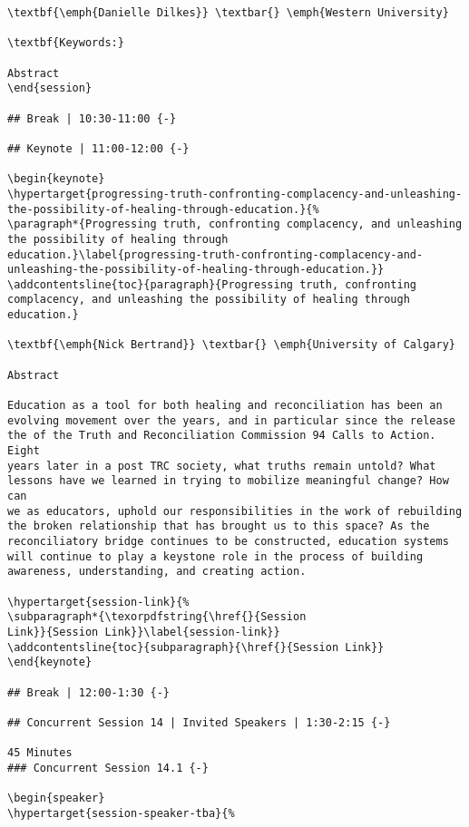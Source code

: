 \documentclass[
]{book}
\begin{document}
\begin{verbatim}
\textbf{\emph{Danielle Dilkes}} \textbar{} \emph{Western University}

\textbf{Keywords:}

Abstract
\end{session}

## Break | 10:30-11:00 {-}

## Keynote | 11:00-12:00 {-}

\begin{keynote}
\hypertarget{progressing-truth-confronting-complacency-and-unleashing-the-possibility-of-healing-through-education.}{%
\paragraph*{Progressing truth, confronting complacency, and unleashing
the possibility of healing through
education.}\label{progressing-truth-confronting-complacency-and-unleashing-the-possibility-of-healing-through-education.}}
\addcontentsline{toc}{paragraph}{Progressing truth, confronting
complacency, and unleashing the possibility of healing through
education.}

\textbf{\emph{Nick Bertrand}} \textbar{} \emph{University of Calgary}

Abstract

Education as a tool for both healing and reconciliation has been an
evolving movement over the years, and in particular since the release
the of the Truth and Reconciliation Commission 94 Calls to Action. Eight
years later in a post TRC society, what truths remain untold? What
lessons have we learned in trying to mobilize meaningful change? How can
we as educators, uphold our responsibilities in the work of rebuilding
the broken relationship that has brought us to this space? As the
reconciliatory bridge continues to be constructed, education systems
will continue to play a keystone role in the process of building
awareness, understanding, and creating action.

\hypertarget{session-link}{%
\subparagraph*{\texorpdfstring{\href{}{Session
Link}}{Session Link}}\label{session-link}}
\addcontentsline{toc}{subparagraph}{\href{}{Session Link}}
\end{keynote}

## Break | 12:00-1:30 {-}

## Concurrent Session 14 | Invited Speakers | 1:30-2:15 {-}

45 Minutes
### Concurrent Session 14.1 {-}

\begin{speaker}
\hypertarget{session-speaker-tba}{%

\end{verbatim}
\end{document}
